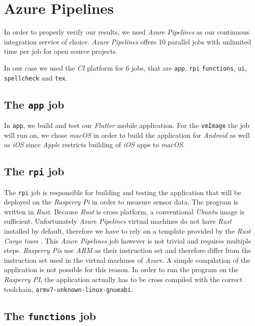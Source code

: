 \section{Azure Pipelines}

In order to properly verify our results, we used \textit{Azure Pipelines} as our continuous
integration service of choice. \textit{Azure Pipelines} offers 10 parallel jobs with unlimited time
per job for open source projects. \cite{azure-pipelines-devop}

In our case we used the \textit{CI} platform for 6 jobs, that are \texttt{app}, \texttt{rpi}
\texttt{functions}, \texttt{ui}, \texttt{spellcheck} and \texttt{tex}.

\subsection{The \texttt{app} job}

In \texttt{app}, we build and test our \textit{Flutter} mobile application. For the \texttt{vmImage}
the job will run on, we chose \textit{macOS} in order to build the application for \textit{Android}
as well as \textit{iOS} since \textit{Apple} restricts building of \textit{iOS} apps to
\textit{macOS}.

\subsection{The \texttt{rpi} job}

The \texttt{rpi} job is responsible for building and testing the application that will be deployed
on the \textit{Rasperry Pi} in order to measure sensor data. The program is written in
\textit{Rust}. Because \textit{Rust} is cross platform, a conventional \textit{Ubuntu} image is
sufficient. Unfortunately \textit{Azure Pipelines} virtual machines do not have \textit{Rust}
installed by default, therefore we have to rely on a template provided by the \textit{Rust Cargo
team} \cite{rust-cargo}. This \textit{Azure Pipelines} job however is not trivial and requires
multiple steps. \textit{Rasperry Pis} use \textit{ARM} as their instruction set and therefore differ
from the instruction set used in the virtual machines of \textit{Azure}. A simple compilation of the
application is not possible for this reason. In order to run the program on the \textit{Rasperry
PI}, the application actually has to be cross compiled with the correct toolchain,
\texttt{armv7-unknown-linux-gnueabi}.

\subsection{The \texttt{functions} job}
\label{sec:azure-function}

